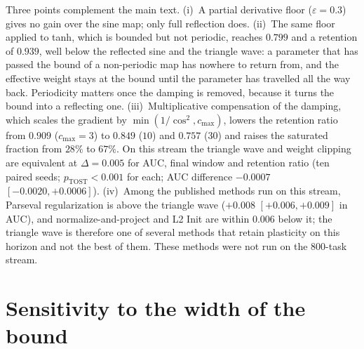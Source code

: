 \documentclass[11pt,a4paper]{article}
\begin{document}
Three points complement the main text. (i)~A partial derivative floor ($\varepsilon=0.3$) gives no gain over
the sine map; only full reflection does. (ii)~The same floor applied to tanh, which is bounded but not
periodic, reaches $0.799$ and a retention of $0.939$, well below the reflected sine and the triangle wave: a
parameter that has passed the bound of a non-periodic map has nowhere to return from, and the effective weight
stays at the bound until the parameter has travelled all the way back. Periodicity matters once the damping
is removed, because it turns the bound into a reflecting one. (iii)~Multiplicative compensation of the
damping, which scales the gradient by $\min(1/\cos^2,c_{\max})$, lowers the retention ratio from $0.909$
($c_{\max}=3$) to $0.849$ ($10$) and $0.757$ ($30$) and raises the saturated fraction from $28\%$ to $67\%$.
On this stream the triangle wave and weight clipping are equivalent at $\Delta=0.005$ for AUC, final window
and retention ratio (ten paired seeds; $p_{\mathrm{TOST}}<0.001$ for each; AUC difference $-0.0007$
$[-0.0020,+0.0006]$). (iv)~Among the published methods run on this stream, Parseval regularization is above
the triangle wave ($+0.008$ $[+0.006,+0.009]$ in AUC), and normalize-and-project and L2 Init are within $0.006$
below it; the triangle wave is therefore one of several methods that retain plasticity on this horizon and
not the best of them. These methods were not run on the 800-task stream.

\section{Sensitivity to the width of the bound}\label{app:gamma}
\end{document}
